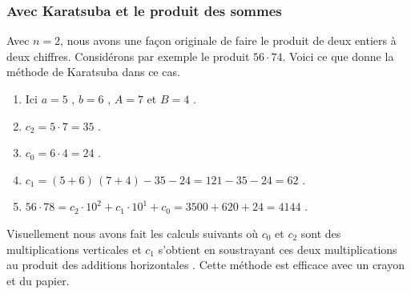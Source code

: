\subsubsection{Avec Karatsuba et le produit des sommes}

Avec $n = 2$, nous avons une façon originale de faire le produit de deux entiers à deux chiffres. Considérons par exemple le produit $56 \cdot 74$. Voici ce que donne la méthode de Karatsuba dans ce cas.
	
\begin{enumerate}
	\item Ici $a = 5$ , $b = 6$ , $A = 7$ et $B = 4$ .

	\item $c_2 = 5 \cdot 7 = 35$ .

	\item $c_0 = 6 \cdot 4 = 24$ .

	\item $c_1 = (5 + 6) \, (7 + 4) - 35 - 24 = 121 - 35 - 24 = 62$ .

	\item $56 \cdot 78 = c_2 \cdot 10^2 + c_1 \cdot 10^1 + c_0 = 3500 + 620 + 24 = 4144$ .
\end{enumerate}
	
\medskip
	
Visuellement nous avons fait les calculs suivants où $c_0$ et $c_2$ sont des multiplications \og verticales \fg{} et $c_1$ s'obtient en soustrayant ces deux multiplications au produit des \og additions horizontales \fg{}.
Cette méthode est efficace avec un crayon et du papier.
	
